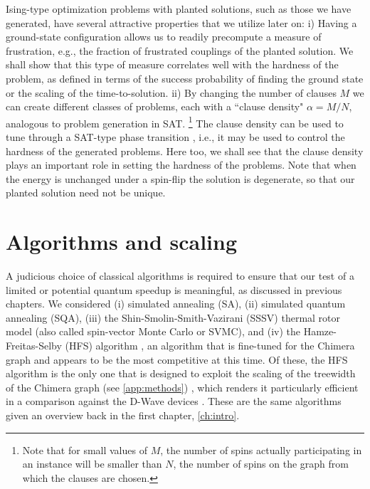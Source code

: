 Ising-type optimization problems with planted solutions, such as those we have generated, have several attractive properties that we utilize later on:
i) Having a ground-state configuration allows us to readily precompute a measure of frustration, e.g., the fraction of frustrated couplings of the planted solution. We shall show that this type of measure correlates well with the hardness of the problem, as defined in terms of the success probability of finding the ground state or the scaling of the time-to-solution. ii) By changing the number of clauses $M$ we can create different classes of problems, each with a ``clause density" $\alpha=M/N$, analogous to problem generation in SAT.%
\footnote{Note that for small values of $M$, the number of spins actually participating in an instance will be smaller than $N$, the number of spins on the graph from which the clauses are chosen.}
The clause density can be used to tune through a SAT-type phase transition \cite{Bollobas:2001}, i.e., it may be used to control the hardness of the generated problems. Here too, we shall see that the clause density plays an important role in setting the hardness of the problems.
Note that when the energy is unchanged under a spin-flip the solution is degenerate, so that our planted solution need not be unique.

\section{Algorithms and scaling}
A judicious choice of classical algorithms is required to ensure that our test of a limited or potential quantum speedup is meaningful, as discussed in previous chapters.
We considered (i) simulated annealing (SA), (ii) simulated quantum annealing (SQA), (iii) the Shin-Smolin-Smith-Vazirani (SSSV) thermal rotor model (also called spin-vector Monte Carlo or SVMC), and (iv) the Hamze-Freitas-Selby (HFS) algorithm \cite{hamze:04,Selby:2014tx}, an algorithm that is fine-tuned for the Chimera graph and appears to be the most competitive at this time.
Of these, the HFS algorithm is the only one that is designed to exploit the scaling of the treewidth of the Chimera graph (see \ref{app:methods})
, which renders it particularly efficient in a comparison against the D-Wave devices \cite{selby:13b}. These are the same algorithms given an overview back in the first chapter, \ref{ch:intro}.


